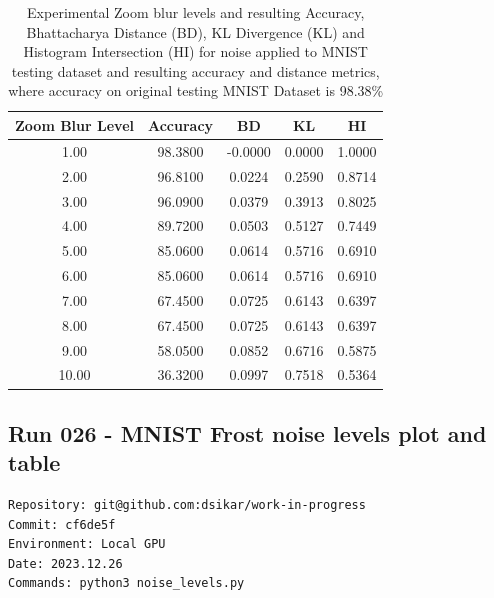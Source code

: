 \begin{table}[ht]
\centering
\begin{tabular}{|c|c|c|c|c|}
\hline
Zoom Blur Level & Accuracy & BD & KL & HI \\
\hline

1.00 & 98.3800 & -0.0000 & 0.0000 & 1.0000 \\
2.00 & 96.8100 & 0.0224 & 0.2590 & 0.8714 \\
3.00 & 96.0900 & 0.0379 & 0.3913 & 0.8025 \\
4.00 & 89.7200 & 0.0503 & 0.5127 & 0.7449 \\
5.00 & 85.0600 & 0.0614 & 0.5716 & 0.6910 \\
6.00 & 85.0600 & 0.0614 & 0.5716 & 0.6910 \\
7.00 & 67.4500 & 0.0725 & 0.6143 & 0.6397 \\
8.00 & 67.4500 & 0.0725 & 0.6143 & 0.6397 \\
9.00 & 58.0500 & 0.0852 & 0.6716 & 0.5875 \\
10.00 & 36.3200 & 0.0997 & 0.7518 & 0.5364 \\

\hline
\end{tabular}
\caption{Experimental Zoom blur levels and resulting Accuracy, Bhattacharya Distance (BD), KL Divergence (KL) and Histogram Intersection (HI) for noise applied to MNIST testing dataset and resulting accuracy and distance metrics, where accuracy on original testing MNIST Dataset is 98.38\%}
\label{tbl-snow-levels}
\end{table}


\subsection{Run 026 - MNIST Frost noise levels plot and table}
\label{app_res:026}
\begin{verbatim}
Repository: git@github.com:dsikar/work-in-progress
Commit: cf6de5f
Environment: Local GPU
Date: 2023.12.26
Commands: python3 noise_levels.py
\end{verbatim}

